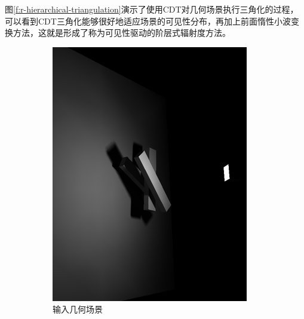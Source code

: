 图\ref{f:r-hierarchical-triangulation}演示了使用CDT对几何场景执行三角化的过程，可以看到CDT三角化能够很好地适应场景的可见性分布，再加上前面惰性小波变换方法，这就是形成了称为可见性驱动的阶层式辐射度方法。

\begin{figure}
\begin{fullwidth}
	\begin{subfigure}[b]{0.245\thewidth}
		\includegraphics[width=1.\textwidth]{figures/r/hierarchical-triangulation-1}
		\caption{输入几何场景}
	\end{subfigure}
	\begin{subfigure}[b]{0.245\thewidth}

\end{subfigure}
\end{fullwidth}
\end{figure}
